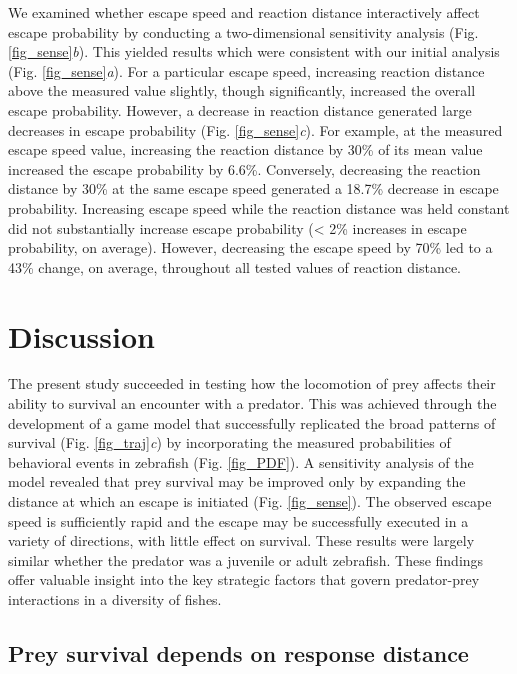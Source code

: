 \documentclass[]{rsos}%
\begin{document}
We examined whether escape speed and reaction distance interactively affect escape probability by conducting a two-dimensional sensitivity analysis (Fig. \ref{fig_sense}\textit{b}).
This yielded results which were consistent with our initial analysis (Fig. \ref{fig_sense}\textit{a}). 
For a particular escape speed, increasing reaction distance above the measured value slightly, though significantly, increased the overall escape probability. 
However, a decrease in reaction distance generated large decreases in escape probability (Fig. \ref{fig_sense}\textit{c}). 
For example, at the measured escape speed value, increasing the reaction distance by 30\% of its mean value increased the escape probability by 6.6\%. 
Conversely, decreasing the reaction distance by 30\% at the same escape speed generated a 18.7\% decrease in escape probability.
Increasing escape speed while the reaction distance was held constant did not substantially increase escape probability (< 2\% increases in escape probability, on average).
However, decreasing the escape speed by 70\% led to a 43\% change, on average, throughout all tested values of reaction distance.



\section{Discussion}%

The present study succeeded in testing how the locomotion of prey affects their ability to survival an encounter with a predator.
This was achieved through the development of a game model that successfully replicated the broad patterns of survival (Fig. \ref{fig_traj}\textit{c}) by incorporating the measured probabilities of behavioral events in zebrafish (Fig. \ref{fig_PDF}).
A sensitivity analysis of the model revealed that prey survival may be improved only by expanding the distance at which an escape is initiated (Fig. \ref{fig_sense}). 
The observed escape speed is sufficiently rapid and the escape may be successfully executed in a variety of directions, with little effect on survival.
These results were largely similar whether the predator was a juvenile or adult zebrafish.
These findings offer valuable insight into the key strategic factors that govern predator-prey interactions in a diversity of fishes. 

\subsection{Prey survival depends on response distance} 
\end{document}
